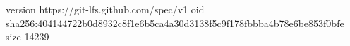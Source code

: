 version https://git-lfs.github.com/spec/v1
oid sha256:404144722b0d8932c8f1e6b5ca4a30d3138f5c9f178fbbba4b78e6be853f0bfe
size 14239
